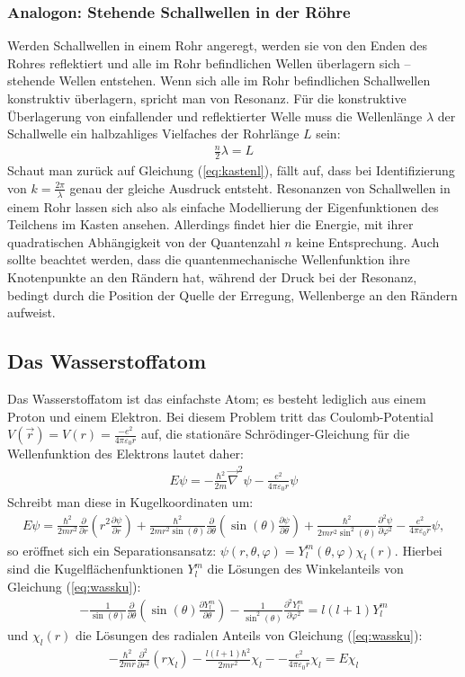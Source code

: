 \documentclass[numbers=noenddot,12pt,a4paper]{scrartcl}
\newcommand{\partiell}[2]{\frac{\partial #1}{\partial #2}}
\newcommand{\partiellz}[2]{\frac{\partial^2 #1}{\partial #2^2}}
\begin{document}
\subsubsection{Analogon: Stehende Schallwellen in der Röhre}
Werden Schallwellen in einem Rohr angeregt, werden sie von den Enden des Rohres reflektiert und alle im Rohr befindlichen Wellen überlagern sich -- stehende Wellen entstehen. Wenn sich alle im Rohr befindlichen Schallwellen konstruktiv überlagern, spricht man von Resonanz. Für die konstruktive Überlagerung von einfallender und reflektierter Welle muss die Wellenlänge $\lambda$ der Schallwelle ein halbzahliges Vielfaches der Rohrlänge $L$ sein:
\begin{align}
\frac{n}{2}\lambda=L
\end{align}
Schaut man zurück auf Gleichung (\ref{eq:kastenl}), fällt auf, dass bei Identifizierung von $k=\frac{2\pi}{\lambda}$ genau der gleiche Ausdruck entsteht. Resonanzen von Schallwellen in einem Rohr lassen sich also als einfache Modellierung der Eigenfunktionen des Teilchens im Kasten ansehen. Allerdings findet hier die Energie, mit ihrer quadratischen Abhängigkeit von der Quantenzahl $n$ keine Entsprechung. Auch sollte beachtet werden, dass die quantenmechanische Wellenfunktion ihre Knotenpunkte an den Rändern hat, während der Druck bei der Resonanz, bedingt durch die Position der Quelle der Erregung, Wellenberge an den Rändern aufweist.
\subsection{Das Wasserstoffatom}
Das Wasserstoffatom ist das einfachste Atom; es besteht lediglich aus einem Proton und einem Elektron. Bei diesem Problem tritt das Coulomb-Potential $V(\vec{r})=V(r)=\frac{-e^2}{4\pi\varepsilon_0 r}$ auf, die stationäre Schrödinger-Gleichung für die Wellenfunktion des Elektrons lautet daher:
\begin{align}
E\psi=-\frac{\hbar^2}{2m}\vec{\nabla}^2 \psi-\frac{e^2}{4\pi\varepsilon_0 r}\psi\label{eq:wass}
\end{align}
Schreibt man diese in Kugelkoordinaten um:
\begin{align}
E\psi=\frac{\hbar^2}{2mr^2}\partiell{}{r}\left(r^2\partiell{\psi}{r}\right)+\frac{\hbar^2}{2mr^2\sin(\theta)}\partiell{}{\theta}\left(\sin(\theta)\partiell{\psi}{\theta}\right)+\frac{\hbar^2}{2mr^2\sin^2(\theta)}\partiellz{\psi}{\varphi}-\frac{e^2}{4\pi\varepsilon_0 r}\psi,\label{eq:wassku}
\end{align}
so eröffnet sich ein Separationsansatz: $\psi(r,\theta,\varphi)=Y^m_l(\theta,\varphi)\chi_l(r)$. Hierbei sind die Kugelflächenfunktionen $Y_l^m$ die Lösungen des Winkelanteils von Gleichung (\ref{eq:wassku}):
\begin{align}
-\frac{1}{\sin(\theta)}\partiell{}{\theta}\left(\sin(\theta)\partiell{Y_l^m}{\theta}\right)-\frac{1}{\sin^2(\theta)}\partiellz{Y_l^m}{\varphi}=l(l+1)Y_l^m
\end{align}
und $\chi_l(r)$ die Lösungen des radialen Anteils von Gleichung (\ref{eq:wassku}):
\begin{align}
-\frac{\hbar^2}{2mr}\partiellz{}{r}\left(r\chi_l\right)-\frac{l(l+1)\hbar^2}{2mr^2}\chi_l--\frac{e^2}{4\pi\varepsilon_0 r}\chi_l=E\chi_l
\end{align}
\end{document}
